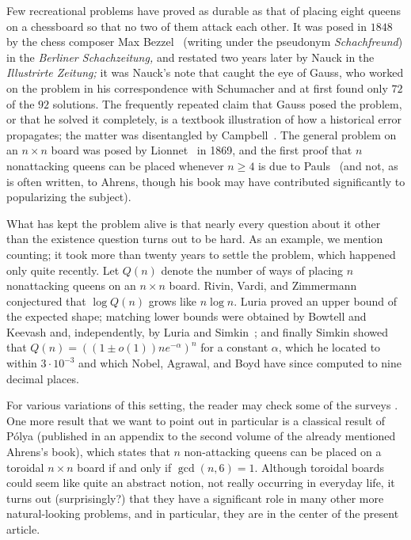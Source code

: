 \documentclass[10pt,a4paper]{article}
\theoremstyle{definition}
\begin{document}
Few recreational problems have proved as durable as that of placing eight
queens on a chessboard so that no two of them attack each other. It was posed
in $1848$ by the chess composer Max Bezzel~\cite{bezzel} (writing under the pseudonym \emph{Schachfreund}) in the
\emph{Berliner Schachzeitung,} and restated two years later by Nauck \cite{nauck} in the
\emph{Illustrirte Zeitung;} it was Nauck's note that caught the eye of Gauss,
who worked on the problem in his correspondence with Schumacher and at first
found only $72$ of the $92$ solutions. The frequently repeated claim that Gauss
posed the problem, or that he solved it completely, is a textbook illustration
of how a historical error propagates; the matter was disentangled by Campbell~\cite{campbell}. The general problem on an $n\times n$ board was posed by Lionnet~\cite{lionett} in 1869, and the first proof that $n$ nonattacking queens
can be placed whenever $n\geqslant4$ is due to Pauls~\cite{pauls} (and not, as is often written, to Ahrens, though his book \cite{ahrens} may have contributed significantly to popularizing the subject).

What has kept the problem alive is that nearly every question about it other
than the existence question turns out to be hard. As an example, we mention counting; it took more than twenty years to settle the problem, which happened only quite recently. Let $Q(n)$ denote the number of ways of placing $n$ nonattacking
queens on an $n\times n$ board. Rivin, Vardi, and Zimmermann \cite{rivin}
conjectured that $\log Q(n)$ grows like $n\log n$. Luria \cite{luria} proved an upper bound of the
expected shape; matching lower bounds were obtained by Bowtell and Keevash
\cite{bowtell} and, independently, by Luria and Simkin~\cite{luriasimkin};
and finally Simkin \cite{simkin} showed that $Q(n)=((1\pm o(1))ne^{-\alpha})^n$
for a constant $\alpha$, which he located to within $3\cdot10^{-3}$ and which
Nobel, Agrawal, and Boyd \cite{nobel} have since computed to nine decimal
places.

For various variations of this setting, the reader may check some of the surveys \cite{watkins,bellstevens,hedetniemi}. One more result that we want to point out in particular is a classical result of P\'olya \cite{polya} (published in an
appendix to the second volume of the already mentioned Ahrens's book), which 
states that $n$ non-attacking queens can be placed on a toroidal $n\times n$ board if and only if $\gcd(n,6)=1$. Although toroidal boards could seem like quite an abstract notion, not really occurring in everyday life, it turns out (surprisingly?) that they have a significant role in many other more natural-looking problems, and in particular, they are in the center of the present article.
\end{document}
